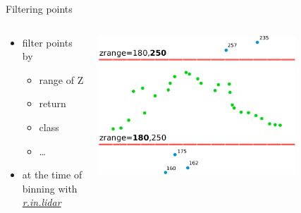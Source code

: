 \documentclass[xcolor={dvipsnames,usenames},beamer,aspectratio=169]{beamer}
\newcommand{\gmodule}[1]{\href{http://grass.osgeo.org/grass71/manuals/#1.html}{\emph{#1}}}
\begin{document}
\begin{frame}{Filtering points}

\begin{columns}
\begin{column}{0.38\textwidth}

 \begin{itemize}
  \item filter points by
  \begin{itemize}
    \item range of Z
    \item return
    \item class
    \item \ldots
  \end{itemize}
  \item at the time of binning with \gmodule{r.in.lidar}
\end{itemize}

\end{column}
\begin{column}{0.6\textwidth}

\begin{center}
  \includegraphics[width=0.75\textwidth]{features/zrange}
\end{center}

\end{column}
\end{columns}

\end{frame}
\end{document}
